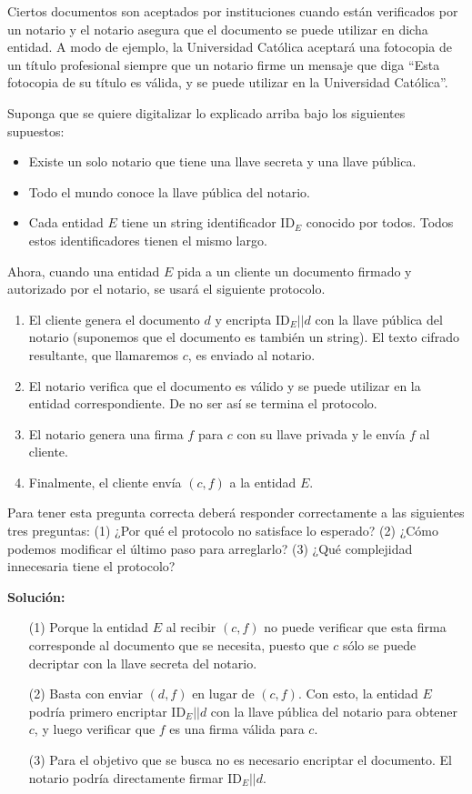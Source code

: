 
Ciertos documentos son aceptados por instituciones cuando están verificados por un notario y el notario asegura que el documento se puede utilizar en dicha entidad. A modo de ejemplo, la Universidad Católica aceptará una fotocopia de un título profesional siempre que un notario firme un mensaje que diga ``Esta fotocopia de su título es válida, y se puede utilizar en la Universidad Católica''.

Suponga que se quiere digitalizar lo explicado arriba bajo los siguientes supuestos:
\begin{itemize}
  \item Existe un solo notario que tiene una llave secreta y una llave pública.
  \item Todo el mundo conoce la llave pública del notario.
  \item Cada entidad $E$ tiene un string identificador $\text{ID}_E$ conocido por todos. Todos estos identificadores tienen el mismo largo.
\end{itemize}

Ahora, cuando una entidad $E$ pida a un cliente un documento firmado y autorizado por el notario, se usará el siguiente protocolo.

\begin{enumerate}
  \item El cliente genera el documento $d$ y encripta $\text{ID}_E || d$ con la llave pública del notario (suponemos que el documento es también un string). El texto cifrado resultante, que llamaremos $c$, es enviado al notario.
  \item El notario verifica que el documento es válido y se puede utilizar en la entidad correspondiente. De no ser así se termina el protocolo.
  \item El notario genera una firma $f$ para $c$ con su llave privada y le envía $f$ al cliente.
  \item Finalmente, el cliente envía $(c,f)$ a la entidad $E$.
\end{enumerate}

Para tener esta pregunta correcta deberá responder correctamente a las siguientes tres preguntas: (1) ¿Por qué el protocolo no satisface lo esperado? (2) ¿Cómo podemos modificar el último paso para arreglarlo? (3) ¿Qué complejidad innecesaria tiene el protocolo?

\textbf{Solución:}
\begin{itemize}
\item[(1)] Porque la entidad $E$ al recibir $(c, f)$ no puede verificar que esta firma corresponde al documento que se necesita, puesto que $c$ sólo se puede decriptar con la llave secreta del notario.
\item[(2)] Basta con enviar $(d,f)$ en lugar de $(c,f)$. Con esto, la entidad $E$ podría primero encriptar $\text{ID}_E || d$ con la llave pública del notario para obtener $c$, y luego verificar que $f$ es una firma válida para $c$.
\item[(3)] Para el objetivo que se busca no es necesario encriptar el documento. El notario podría directamente firmar $\text{ID}_E || d$.
\end{itemize}

